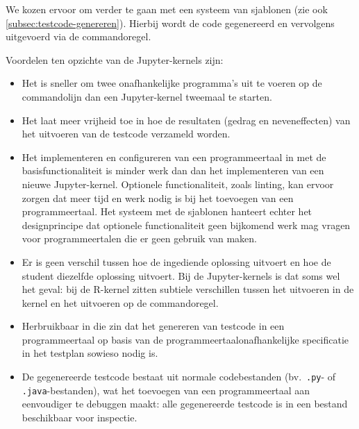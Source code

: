 We kozen ervoor om verder te gaan met een systeem van sjablonen (zie ook \cref{subsec:testcode-genereren}).
Hierbij wordt de code gegenereerd en vervolgens uitgevoerd via de commandoregel.

Voordelen ten opzichte van de Jupyter-kernels zijn:
\begin{itemize}
    \item Het is sneller om twee onafhankelijke programma's uit te voeren op de commandolijn dan een Jupyter-kernel tweemaal te starten.
    \item Het laat meer vrijheid toe in hoe de resultaten (gedrag en neveneffecten) van het uitvoeren van de testcode verzameld worden.
    \item Het implementeren en configureren van een programmeertaal in \tested{} met de basisfunctionaliteit is minder werk dan dan het implementeren van een nieuwe Jupyter-kernel.
    Optionele functionaliteit, zoals linting, kan ervoor zorgen dat meer tijd en werk nodig is bij het toevoegen van een programmeertaal.
    Het systeem met de sjablonen hanteert echter het designprincipe dat optionele functionaliteit geen bijkomend werk mag vragen voor programmeertalen die er geen gebruik van maken.
    \item Er is geen verschil tussen hoe \tested{} de ingediende oplossing uitvoert en hoe de student diezelfde oplossing uitvoert.
    Bij de Jupyter-kernels is dat soms wel het geval: bij de R-kernel zitten subtiele verschillen tussen het uitvoeren in de kernel en het uitvoeren op de commandoregel.
    \item Herbruikbaar in die zin dat het genereren van testcode in een programmeertaal op basis van de programmeertaalonafhankelijke specificatie in het testplan sowieso nodig is.
    \item De gegenereerde testcode bestaat uit normale codebestanden (bv.\ \texttt{.py}- of \texttt{.java}-bestanden), wat het toevoegen van een programmeertaal aan \tested{} eenvoudiger te debuggen maakt: alle gegenereerde testcode is in een bestand beschikbaar voor inspectie.
\end{itemize}

